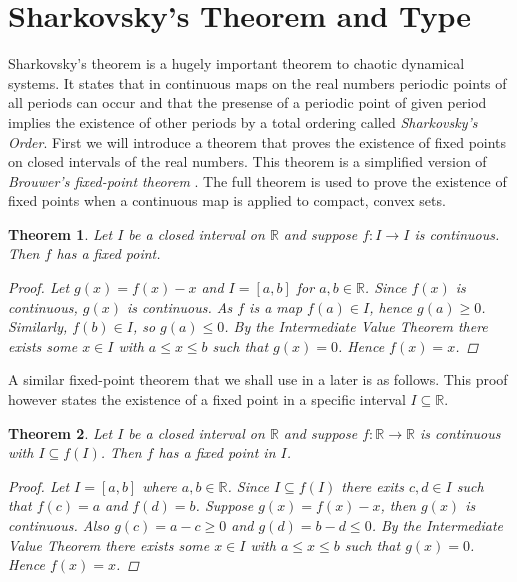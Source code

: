 \documentclass[11pt,a4paper,oneside]{memoir}
\theoremstyle{plain}
\newtheorem{thm}{Theorem}[chapter]
\theoremstyle{definition}
\begin{document}
\section{Sharkovsky's Theorem and Type}\label{sec:sharkovsky}
Sharkovsky's theorem \cite{sharkovsky} is a hugely important theorem to chaotic dynamical systems. It states that in continuous maps on the real numbers periodic points of all periods can occur and that the presense of a periodic point of given period implies the existence of other periods by a total ordering called \emph{Sharkovsky's Order}. First we will introduce a theorem that proves the existence of fixed points on closed intervals of the real numbers. This theorem is a simplified version of \emph{Brouwer's fixed-point theorem} \cite{brouwer}. The full theorem is used to prove the existence of fixed points when a continuous map is applied to compact, convex sets.
\begin{thm} \label{thm:fixed-points}
    Let $I$ be a closed interval on $\mathbb{R}$ and suppose $f: I \to I$ is continuous. Then $f$ has a fixed point.
    \begin{proof}
        Let $g(x) = f(x) - x$ and $I = [a, b]$ for $a, b \in \mathbb{R}$. Since $f(x)$ is continuous, $g(x)$ is continuous. As $f$ is a map $f(a) \in I$, hence $g(a) \geq 0$. Similarly, $f(b) \in I$, so $g(a) \leq 0$. By the Intermediate Value Theorem there exists some $x \in I$ with $a \leq x \leq b$ such that $g(x) = 0$. Hence $f(x) = x$.
    \end{proof}
\end{thm}

A similar fixed-point theorem that we shall use in a later is as follows. This proof however states the existence of a fixed point in a specific interval $I \subseteq \mathbb{R}$.

\begin{thm} \label{thm:interval-fixed-points}
    Let $I$ be a closed interval on $\mathbb{R}$ and suppose $f: \mathbb{R} \to \mathbb{R}$ is continuous with $I \subseteq f(I)$. Then $f$ has a fixed point in $I$.
    \begin{proof}
        Let $I = [a, b]$ where $a, b \in \mathbb{R}$. Since $I \subseteq f(I)$ there exits $c, d \in I$ such that $f(c) = a$ and $f(d) = b$. Suppose $g(x) = f(x) - x$, then $g(x)$ is continuous. Also $g(c) = a - c \geq 0$ and $g(d) = b - d \leq 0$. By the Intermediate Value Theorem there exists some $x \in I$ with $a \leq x \leq b$ such that $g(x) = 0$. Hence $f(x) = x$.
    \end{proof}
\end{thm}
\end{document}
